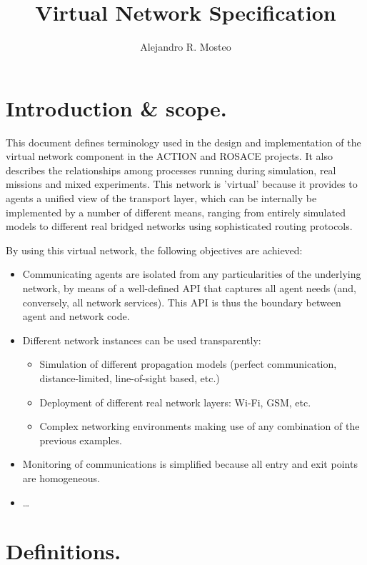 \documentclass[a4paper,11pt]{article}
\newcommand{\myauthor}{Alejandro R. Mosteo}
\newcommand{\mytitle}{Virtual Network Specification}
\begin{document}
\author{\myauthor}
\title{\mytitle}
\maketitle

\section{Introduction \& scope.}

This document defines terminology used in the design and implementation of the virtual network component in the ACTION and ROSACE projects. It also describes the relationships among processes running during simulation, real missions and mixed experiments. This network is 'virtual' because it provides to agents a unified view of the transport layer, which can be internally be implemented by a number of different means, ranging from entirely simulated models to different real bridged networks using sophisticated routing protocols. 

By using this virtual network, the following objectives are achieved:

\begin{itemize}
    \item Communicating agents are isolated from any particularities of the underlying network, by means of a well-defined API that captures all agent needs (and, conversely, all network services). This API is thus the boundary between agent and network code.
    \item Different network instances can be used transparently:
        \begin{itemize}
            \item Simulation of different propagation models (perfect communication, distance-limited, line-of-sight based, etc.)
            \item Deployment of different real network layers: Wi-Fi, GSM, etc.
            \item Complex networking environments making use of any combination of the previous examples.
        \end{itemize}
    \item Monitoring of communications is simplified because all entry and exit points are homogeneous.
    \item \dots
\end{itemize}


\section{Definitions.}
\end{document}
